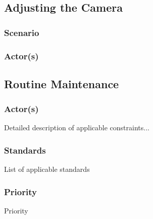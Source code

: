 \subsection{Adjusting the Camera}
\subsubsection{Scenario}

\subsubsection{Actor(s)}
\subsection{Routine Maintenance}


\subsubsection{Actor(s)}

Detailed description of applicable constraints...
\subsubsection{Standards}
List of applicable standards
\subsubsection{Priority}
Priority
